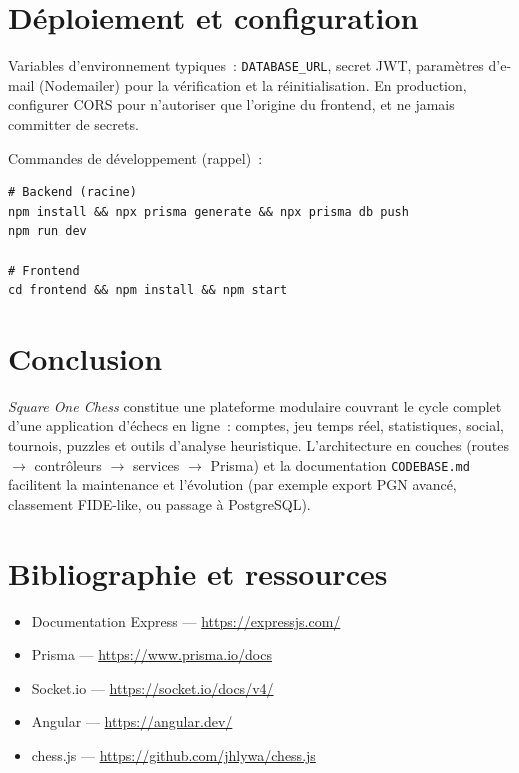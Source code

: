 \documentclass[11pt,a4paper]{report}
\begin{document}
\chapter{Déploiement et configuration}

Variables d'environnement typiques~: \texttt{DATABASE\_URL}, secret JWT, paramètres d'e-mail (Nodemailer) pour la vérification et la réinitialisation. En production, configurer CORS pour n'autoriser que l'origine du frontend, et ne jamais committer de secrets.

Commandes de développement (rappel)~:
\begin{lstlisting}
# Backend (racine)
npm install && npx prisma generate && npx prisma db push
npm run dev

# Frontend
cd frontend && npm install && npm start
\end{lstlisting}

\chapter{Conclusion}

\textit{Square One Chess} constitue une plateforme modulaire couvrant le cycle complet d'une application d'échecs en ligne~: comptes, jeu temps réel, statistiques, social, tournois, puzzles et outils d'analyse heuristique. L'architecture en couches (routes $\rightarrow$ contrôleurs $\rightarrow$ services $\rightarrow$ Prisma) et la documentation \texttt{CODEBASE.md} facilitent la maintenance et l'évolution (par exemple export PGN avancé, classement FIDE-like, ou passage à PostgreSQL).

\newpage
\appendix
\chapter{Bibliographie et ressources}

\begin{itemize}[leftmargin=*]
  \item Documentation Express — \url{https://expressjs.com/}
  \item Prisma — \url{https://www.prisma.io/docs}
  \item Socket.io — \url{https://socket.io/docs/v4/}
  \item Angular — \url{https://angular.dev/}
  \item chess.js — \url{https://github.com/jhlywa/chess.js}
\end{itemize}
\end{document}
